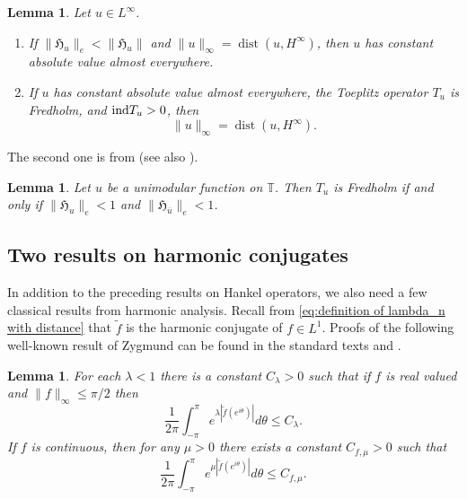 \documentclass[11pt,reqno]{amsart}
\numberwithin{equation}{section}
\theoremstyle{plain}
\newtheorem{Lemma}[equation]{Lemma}
\theoremstyle{definition}
\begin{document}
	\begin{Lemma}\label{Lemma:Unimodular}
		Let $u\in L^\infty$.
		
		\begin{enumerate}
		\item
		If $\|{\mathfrak{H}}_u\|_e<\|{\mathfrak{H}}_u\|$ and $\|u\|_\infty={\operatorname{dist}}(u, H^\infty)$, then $u$ has constant absolute value almost everywhere.
		\item
		If  $u$ has constant absolute value almost everywhere, 
		the Toeplitz operator $T_u$ is Fredholm, and ${\mathop{\rm ind}} T_u>0$, then
		$$\|u\|_\infty={\operatorname{dist}}(u, H^\infty).$$
		\end{enumerate}
	\end{Lemma}
	
The second one is from \cite{MR0259639} (see also \cite[Cor.~3.1.16]{Peller}). 

	\begin{Lemma}\label{Peller-2}
	Let $u$ be a unimodular function on $\mathbb{T}$. Then $T_u$ is Fredholm if and only if $\|{\mathfrak{H}}_u\|_e<1$ and $\|{\mathfrak{H}}_{\overline{u}}\|_e<1$.
	\end{Lemma}

\subsection{Two results on harmonic conjugates}
	In addition to the preceding results on Hankel operators, we also need a few classical results 
	from harmonic analysis.  Recall from \eqref{eq:definition of lambda_n with distance} that $\widetilde f$ is the harmonic conjugate of $f \in L^1$.
	Proofs of the following well-known result of Zygmund can be found in the standard texts
	\cite[V.D]{Koo} and \cite[Corollary III.2.6]{Ga}.
	
	\begin{Lemma}\label{le:zygmund}
		For each $\lambda<1$ there is a constant $C_\lambda>0$ such that if $f$ is real valued and 
		$\|f\|_\infty\leq \pi/2$ then  
		\begin{equation}\label{eq:zygmund1}
			\frac{1}{2\pi}\int_{-\pi}^\pi e^{\lambda |\widetilde f(e^{i \theta})|} d\theta \le C_\lambda.
		\end{equation}
		If $f$ is continuous, then for any  $\mu>0$ there exists a constant $C_{f,\mu}>0$ such that
		\begin{equation}\label{eq:zygmund2}
			\frac{1}{2\pi}\int_{-\pi}^\pi e^{\mu |\widetilde f(e^{i \theta})|} d\theta \le C_{f,\mu}.
		\end{equation}
	\end{Lemma}
\end{document}
